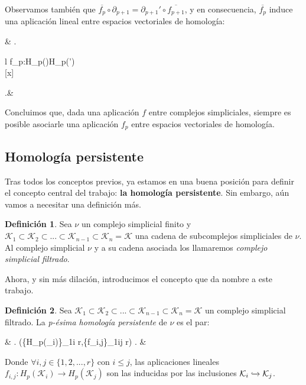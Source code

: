 \documentclass[12pt]{article}
\numberwithin{equation}{section}
\theoremstyle{definition}
\newtheorem{defi}{Definición}
\theoremstyle{remark}
\theoremstyle{plain}
\begin{document}
		Observamos también que $\overline{f_{p}}\circ\partial_{p+1}=\partial_{p+1}'\circ\overline{f_{p+1}}$, y en consecuencia, $\overline{f_{p}}$ induce una aplicación lineal
		entre espacios vectoriales de homología:	
		\begin{flalign*}
			& \left.
			\begin{array}{l}
				f_{p}:H_{p}()\rightarrow H_{p}(')\\[2pt] 
				\hspace{1.35cm} [x] \mapsto [\overline{f_{p}(x)}]
			\end{array}
			\right.&
		\end{flalign*}

		Concluimos que, dada una aplicación $f$ entre complejos simpliciales, siempre es posible asociarle una aplicación $f_{p}$ entre espacios vectoriales de homología.
	
	\subsection{Homología persistente}	
		
		Tras todos los conceptos previos, ya estamos en una buena posición para definir el concepto central del trabajo: \textbf{la homología persistente}. Sin embargo, aún
		vamos a necesitar una definición más.

		\begin{defi}
		
			Sea {\Large $\nu$} un complejo simplicial finito y $\mathcal{K}_{1}\subset\mathcal{K}_{2}\subset...\subset\mathcal{K}_{n-1}\subset\mathcal{K}_{n}=\mathcal{K}$
			una cadena de subcomplejos simpliciales de {\Large $\nu$}. Al complejo simplicial {\Large $\nu$} y a su cadena asociada los llamaremos \textit{complejo simplicial filtrado}.

		\end{defi}

		Ahora, y sin más dilación, introducimos el concepto que da nombre a este trabajo.

		\begin{defi}
		
			Sea $\mathcal{K}_{1}\subset\mathcal{K}_{2}\subset...\subset\mathcal{K}_{n-1}\subset\mathcal{K}_{n}=\mathcal{K}$ un complejo simplicial filtrado. La 
			\textit{p-ésima homología persistente} de {\Large $\nu$} es el par:
			\begin{flalign*}
				& \left.	
				(\{H_{p}(_{i})\}_{1\leq i \leq r},\{f_{i,j}\}_{1\leq i\leq j \leq r})
				\right. &
			\end{flalign*}
			Donde $\forall i,j \in \{1,2,...,r\}$ con $i \leq j$, las aplicaciones lineales 
			$f_{i,j}:H_{p}(\mathcal{K}_{i})\rightarrow H_{p}(\mathcal{K}_{j})$ son las inducidas por las inclusiones $\mathcal{K}_{i}\xhookrightarrow{} \mathcal{K}_{j}$.
	

		\end{defi}
		
\end{document}
